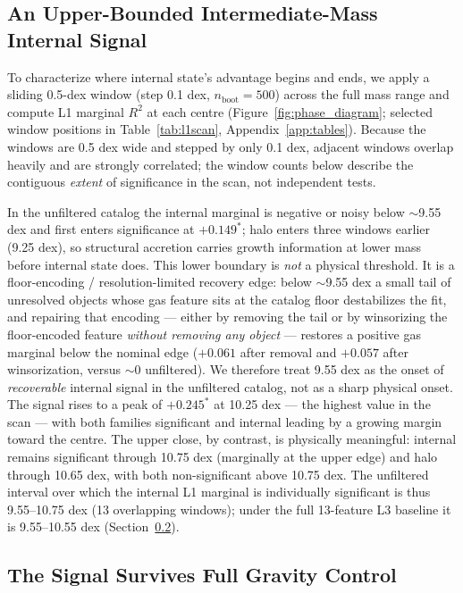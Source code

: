 \documentclass[twocolumn,linenumbers]{aastex701}
\begin{document}
\subsection{An Upper-Bounded Intermediate-Mass Internal Signal}
\label{sec:window}

To characterize where internal state's advantage begins and ends, we apply
a sliding 0.5-dex window (step 0.1 dex, $n_\mathrm{boot} = 500$) across
the full mass range and compute L1 marginal $R^2$ at each centre
(Figure~\ref{fig:phase_diagram}; selected window positions in
Table~\ref{tab:l1scan}, Appendix~\ref{app:tables}).
Because the windows are 0.5 dex wide and stepped by only 0.1 dex, adjacent windows
overlap heavily and are strongly correlated; the window counts below describe the
contiguous \emph{extent} of significance in the scan, not independent tests.

In the unfiltered catalog the internal marginal is negative or noisy below
$\sim$9.55 dex and first enters significance at $+0.149^*$; halo enters three
windows earlier (9.25 dex), so structural accretion carries growth information
at lower mass before internal state does.
This lower boundary is \emph{not} a physical threshold.
It is a floor-encoding / resolution-limited recovery edge: below $\sim$9.55 dex
a small tail of unresolved objects whose gas feature sits at the catalog floor
destabilizes the fit, and repairing that encoding --- either by removing the
tail or by winsorizing the floor-encoded feature \emph{without removing any
object} --- restores a positive gas marginal below the nominal edge ($+0.061$
after removal and $+0.057$ after winsorization, versus $\sim 0$ unfiltered).
We therefore treat 9.55 dex as the onset of \emph{recoverable} internal signal
in the unfiltered catalog, not as a sharp physical onset.
The signal rises to a peak of $+0.245^*$ at 10.25 dex --- the highest value
in the scan --- with both families significant and internal leading by a
growing margin toward the centre.
The upper close, by contrast, is physically meaningful: internal remains
significant through 10.75 dex (marginally at the upper edge) and halo through
10.65 dex, with both non-significant above 10.75 dex.
The unfiltered interval over which the internal L1 marginal is individually
significant is thus 9.55--10.75 dex (13 overlapping windows); under the full
13-feature L3 baseline it is 9.55--10.55 dex (Section~\ref{sec:l3window}).

\subsection{The Signal Survives Full Gravity Control}
\label{sec:l3window}
\end{document}
